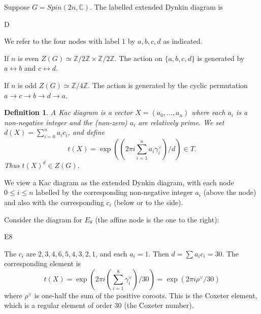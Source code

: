 \documentclass[10pt,leqno]{article}
\newtheorem{definition}[equation]{Definition}
\newcommand{\C}{\mathbb C}
\newcommand{\Z}{\mathbb Z}
\newcommand{\Ztwo}{\mathbb Z/2\Z}
\newcommand{\ch}[1]{#1^\vee}
\def\le{\leqslant}
\begin{document}
\begin{exampleplain}
  Suppose $G=Spin(2n,\C)$.  The labelled extended Dynkin diagram is

  \medskip
  
\begin{dynkinDiagram}[Kac,extended,root radius=.12cm, edge  length=1.0cm]{D}{}
\end{dynkinDiagram}

\medskip

We refer to the four nodes with label $1$ by $a,b,c,d$ as indicated.

If $n$ is even $Z(G)\simeq \Ztwo\times\Ztwo$. The action on
$\{a,b,c,d\}$ is generated by $a\leftrightarrow b$ and
$c\leftrightarrow d$.

If $n$ is odd $Z(G)\simeq \Z/4\Z$. The action is generated by the
cyclic permutation $a\rightarrow c\rightarrow b\rightarrow
d\rightarrow a$.

  
\end{exampleplain}
\begin{definition}
A Kac diagram is a vector $X=(a_0,\dots, a_n)$ where
each $a_i$ is a non-negative integer and the (non-zero) $a_i$ are relatively prime.
We set $d(X)=\sum_{i=0}^n a_ic_i$, and define
$$
t(X)=\exp((2\pi i\sum_{i=1}^n a_i\ch\gamma_i)/d)\in T.
$$
Thus $t(X)^d\in Z(G)$.
\end{definition}

We view a Kac diagram as the extended Dynkin diagram, with each node
$0\le i\le n$ labelled by the corresponding non-negative integer
$a_i$ (above the node) and also with the corresponding $c_i$ (below or
to the side).

\begin{exampleplain}
Consider the diagram for $E_8$ (the affine node is the one to the right):  

\begin{dynkinDiagram}[Kac,extended,root radius=.12cm, edge length=1.0cm]{E}{8}
\end{dynkinDiagram}

\medskip The $c_i$ are $2,3,4,6,5,4,3,2,1$, and each $a_i=1$. Then
$d=\sum a_ic_i=30$. The
corresponding element is
$$
t(X)=\exp(2\pi i(\sum_{i=1}^8 \ch\gamma_i)/30)=\exp(2\pi i\ch\rho/30)
$$
where $\ch\rho$ is one-half the sum of the positive coroots.  This is
the Coxeter element, which is a regular element of order $30$ (the
Coxeter number).
\end{exampleplain}
\end{document}
